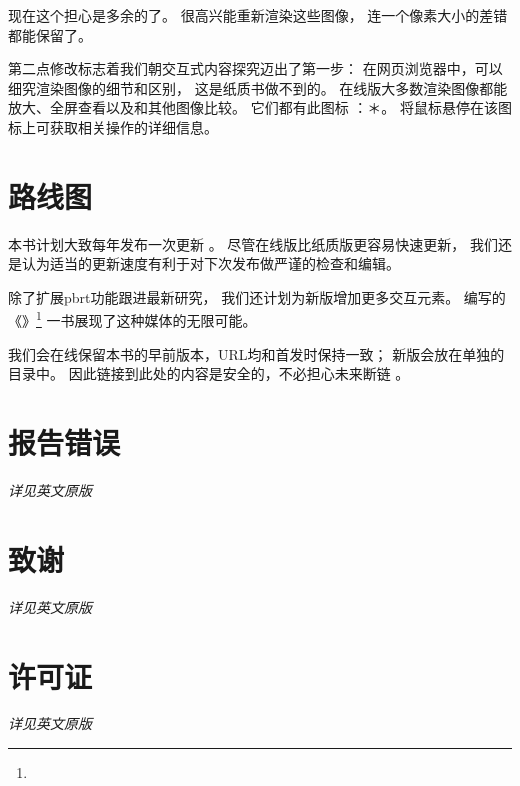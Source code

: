 现在这个担心是多余的了。
很高兴能重新渲染这些图像，
连一个像素大小的差错都能保留了。

第二点修改标志着我们朝交互式内容探究迈出了第一步：
在网页浏览器中，可以细究渲染图像的细节和区别，
这是纸质书做不到的。
在线版大多数渲染图像都能放大、全屏查看以及和其他图像比较。
它们都有此图标
：＊。
将鼠标悬停在该图标上可获取相关操作的详细信息。

\section*{路线图}\label{sec:路线图}

本书计划大致每年发布一次更新
。
尽管在线版比纸质版更容易快速更新，
我们还是认为适当的更新速度有利于对下次发布做严谨的检查和编辑。

除了扩展pbrt功能跟进最新研究，
我们还计划为新版增加更多交互元素。
\citet{4b212a02-105c-42a2-ad5c-91c16a06e815}
编写的《》\footnote{}
一书展现了这种媒体的无限可能。

我们会在线保留本书的早前版本，URL均和首发时保持一致；
新版会放在单独的目录中。
因此链接到此处的内容是安全的，不必担心未来断链
。

\section*{报告错误}\label{sec:报告错误}

{\itshape 详见英文原版}

\section*{致谢}\label{sec:致谢a}

{\itshape 详见英文原版}

\section*{许可证}\label{sec:许可证}

{\itshape 详见英文原版}